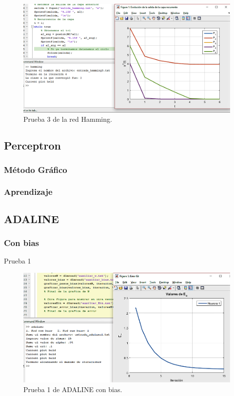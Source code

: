 \documentclass[12pt, titlepage]{article}
\begin{document}
            \begin{figure}[H]
                \begin{center}
                    \includegraphics[width=16cm]{img/hamming3.png}
                    \caption{Prueba 3 de la red Hamming.}
                    \label{fig:hamming3}
                \end{center}
            \end{figure}
        \subsection{Perceptron}
            \subsubsection{Método Gráfico}
            \subsubsection{Aprendizaje}
        \subsection{ADALINE}
            \subsubsection{Con bias}
            Prueba 1
            \begin{figure}[H]
                \begin{center}
                    \includegraphics[width=16cm]{img/adaline1/error.png}
                    \caption{Prueba 1 de ADALINE con bias.}
                    \label{fig:adaline1error}
                \end{center}
            \end{figure}
            
\end{document}
